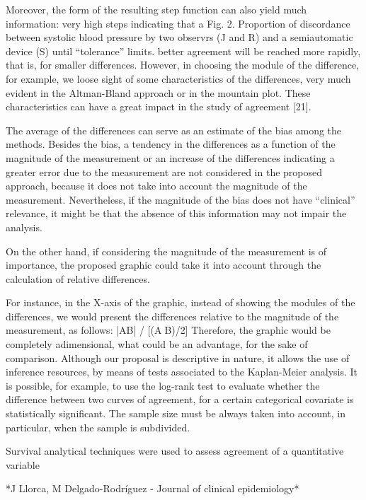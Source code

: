 Moreover, the form of the resulting step function can also yield much information: very high steps indicating that a
Fig. 2. Proportion of discordance between systolic blood pressure by two observrs (J and R) and a semiautomatic device (S) until “tolerance” limits.
better agreement will be reached more rapidly, that is, for smaller differences. However, in choosing the module of the difference,
for example, we loose sight of some characteristics of the differences, very much evident in the Altman-Bland
approach or in the mountain plot. These characteristics can have a great impact in the study of agreement [21]. 

The average of the differences can serve as an estimate of the bias among the methods. Besides the bias, a tendency in the
differences as a function of the magnitude of the measurement or an increase of the differences indicating a greater
error due to the measurement are not considered in the proposed approach, because it does not take into account
the magnitude of the measurement. Nevertheless, if the magnitude of the bias does not have “clinical” relevance, it
might be that the absence of this information may not impair the analysis.

On the other hand, if considering the magnitude of the measurement is of importance, the proposed graphic could
take it into account through the calculation of relative differences.

For instance, in the X-axis of the graphic, instead of showing the modules of the differences, we would present the
differences relative to the magnitude of the measurement,
as follows:
|AB| / [(AB)/2]
Therefore, the graphic would be completely adimensional, what could be an advantage, for the sake of comparison.
Although our proposal is descriptive in nature, it allows the use of inference resources, by means of tests associated to
the Kaplan-Meier analysis. It is possible, for example, to use the log-rank test to evaluate whether the difference between
two curves of agreement, for a certain categorical covariate is statistically significant. The sample size must
be always taken into account, in particular, when the sample is subdivided.

\newpage



Survival analytical techniques were used to assess agreement of a quantitative variable

*J Llorca, M Delgado-Rodríguez - Journal of clinical epidemiology*

